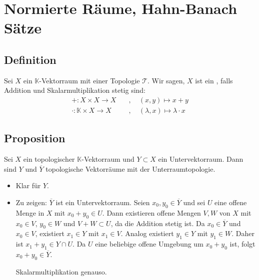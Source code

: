 \section{Normierte Räume, Hahn-Banach Sätze} %
\label{sec:2}

\subsection[Definition: Topologischer Vektorraum]{Definition} %
\label{sub:21}
Sei $X$ ein $\mathds{K}$-Vektorraum mit einer Topologie $\mathcal{T}$. Wir sagen, $X$ ist ein , falls Addition und Skalarmultiplikation stetig sind:
\begin{align*}
	+ : X \times X  \to X \quad &, \quad(x,y) \mapsto x+y \\
	\cdot : \mathds{K} \times X \to X \quad &, \quad (\lambda ,x) \mapsto \lambda \cdot x
\end{align*}

\subsection[Proposition: Unterräume topologischer Vektorräume sind topologische Vektorräume]{Proposition} %
\label{sub:22}
Sei $X$ ein topologischer $\mathds{K}$-Vektorraum und $Y \subset X$ ein Untervektorraum. Dann sind $Y$ und $\overline{Y}$ topologische Vektorräume mit der Unterraumtopologie.
\begin{itemize}
	\item Klar für $Y$.
	\item Zu zeigen: $\overline{Y}$ ist ein Untervektorraum. Seien $x_0, y_0 \in \overline{Y}$ und sei $U$ eine offene Menge in $X$ mit $x_0 + y_0 \in U$. Dann existieren
	offene Mengen $V,W$ von $X$ mit $x_0 \in V$, $y_0 \in W$ und $V+W \subset U$, da die Addition stetig ist. Da $x_0 \in \overline{Y}$ und $x_0 \in V$, existiert 
	$x_1 \in Y$ mit $x_1 \in V$. Analog existiert $y_1 \in Y$ mit $y_1 \in W$. Daher ist $x_1 + y_1 \in Y \cap U$. Da $U$ eine beliebige offene Umgebung um $x_0+ y_0$ ist,
	folgt $x_0 +y_0 \in \overline{Y}$.
	
	Skalarmultiplikation genauso. \bewende
\end{itemize}

